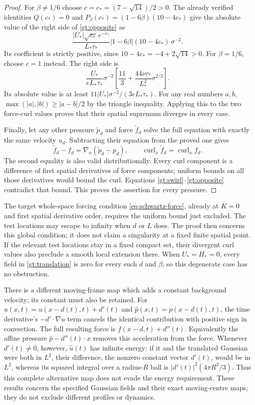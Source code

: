 \begin{proof}
For $\beta\ne1/6$ choose $c=c_*=(7-\sqrt{14})/2>0$.
The already verified identities
$Q(c_*)=0$ and
$P_\beta(c_*)=(1-6\beta)(10-4c_*)$ give the absolute value
of the right side of \eqref{gt:opposite} as
\[
 \frac{|U_*|\sqrt{c_*}\,e^{-c_*}}{L_*\tau_*}
    |1-6\beta|(10-4c_*)\,\sigma^{-2}.
\]
Its coefficient is strictly positive, since
$10-4c_*=-4+2\sqrt{14}>0$.
For $\beta=1/6$, choose $c=1$ instead. The right side is
\[
 \frac{U_*}{eL_*\tau_*}\sigma^{-2}
    \left[\frac{11}{3}
       +\frac{44\nu\tau_*}{L_*^2}\sigma^{2/3}\right].
\]
Its absolute value is at least
$11|U_*|\sigma^{-2}/(3eL_*\tau_*)$.
For any real numbers $a,b$,
$\max(|a|,|b|)\ge |a-b|/2$ by the triangle inequality.
Applying this to the two force-curl values proves that
their spatial supremum diverges in every case.

Finally, let any other pressure $\widetilde p_d$ and force
$\widetilde f_d$ solve the full equation with exactly the
same velocity $u_d$. Subtracting their equation from the
proved one gives
\[
 \widetilde f_d-f_d=\nabla_x(\widetilde p_d-p_d),\qquad
 \operatorname{curl}_x\widetilde f_d
       =\operatorname{curl}_xf_d.
\]
The second equality is also valid distributionally.
Every curl component is a difference of first spatial
derivatives of force components; uniform bounds on all
those derivatives would bound the curl. Equations
\eqref{gt:swirl}--\eqref{gt:opposite} contradict that bound.
This proves the assertion for every pressure.
\end{proof}

The target whole-space forcing condition
\eqref{eq:schwartz-force}, already at $K=0$ and first
spatial derivative order, requires the uniform bound
just excluded. The test locations may escape to infinity
when $d$ or $L$ does. The proof then concerns this global
condition; it does not claim a singularity at a fixed
finite spatial point. If the relevant test locations
stay in a fixed compact set, their divergent curl values
also preclude a smooth local extension there.
When $U_*=H_*=0$, every field in \eqref{gt:translation}
is zero for every such $d$ and $\beta$, so this degenerate
case has no obstruction.

There is a different moving-frame map which adds a
constant background velocity; its constant must also
be retained. For
$\widehat u(x,t)=u(x-d(t),t)+d'(t)$ and
$\widehat p(x,t)=p(x-d(t),t)$, the time derivative's
$-d'\cdot\nabla u$ term cancels the identical contribution
with positive sign in convection. The full resulting
force is $f(x-d,t)+d''(t)$. Equivalently the affine
pressure $\widehat p-d''(t)\cdot x$ removes this
acceleration from the force. Whenever $d'(t)\ne0$,
however, $\widehat u(t)$ has infinite energy:
if it and the translated Gaussian were both in $L^2$,
their difference, the nonzero constant vector $d'(t)$,
would be in $L^2$, whereas its squared integral over
a radius-$R$ ball is $|d'(t)|^2(4\pi R^3/3)$.
Thus this complete alternative map does not evade the
energy requirement. These results concern the specified
Gaussian fields and their exact moving-centre maps;
they do not exclude different profiles or dynamics.
